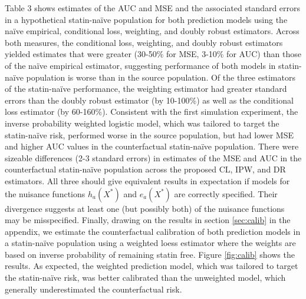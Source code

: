 Table 3 shows estimates of the AUC and MSE and the associated standard errors in a hypothetical statin-na\"{i}ve population for both prediction models using the na\"{i}ve empirical, conditional loss, weighting, and doubly robust estimators. Across both measures, the conditional loss, weighting, and doubly robust estimators yielded estimates that were greater (30-50\% for MSE, 3-10\% for AUC) than those of the na\"{i}ve empirical estimator, suggesting performance of both models in statin-na\"{i}ve population is worse than in the source population. Of the three estimators of the statin-na\"{i}ve performance, the weighting estimator had greater standard errors than the doubly robust estimator (by 10-100\%) as well as the conditional loss estimator (by 60-160\%). Consistent with the first simulation experiment, the inverse probability weighted logistic model, which was tailored to target the statin-na\"{i}ve risk, performed worse in the source population, but had lower MSE and higher AUC values in the counterfactual statin-na\"{i}ve population. There were sizeable differences (2-3 standard errors) in estimates of the MSE and AUC in the counterfactual statin-na\"{i}ve population across the proposed CL, IPW, and DR estimators. All three should give equivalent results in expectation if models for the nuisance functions $h_a(X^*)$ and $e_a(X^*)$ are correctly specified. Their divergence suggests at least one (but possibly both) of the nuisance functions may be misspecified. Finally, drawing on the results in section \ref{sec:calib} in the appendix, we estimate the counterfactual calibration of both prediction models in a statin-na\"{i}ve population using a weighted loess estimator where the weights are based on inverse probability of remaining statin free. Figure \ref{fig:calib} shows the results. As expected, the weighted prediction model, which was tailored to target the statin-na\"{i}ve risk, was better calibrated than the unweighted model, which generally underestimated the counterfactual risk.

